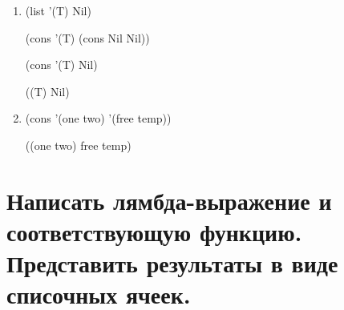 \begin{enumerate}
	(cons T (cons Nil Nil))
	
	(cons T Nil Nil) 
	
	(T Nil Nil)
	
	(T Nil)
	
	\item (list '(T) Nil)
	
	(cons '(T) (cons Nil Nil))
	
	(cons '(T) Nil)
	
	((T) Nil)
	
	\item (cons '(one two) '(free temp))
	
	((one two) free temp)	
\end{enumerate}

\section{Написать лямбда-выражение и соответствующую функцию. Представить результаты в виде списочных ячеек.}
